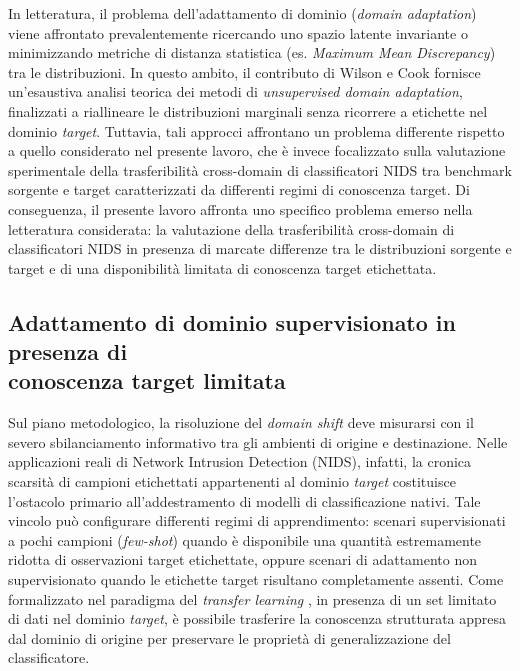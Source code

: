 In letteratura, il problema dell'adattamento di dominio (\textit{domain adaptation}) viene affrontato prevalentemente ricercando uno spazio latente invariante o minimizzando metriche di distanza statistica (es. \textit{Maximum Mean Discrepancy}) tra le distribuzioni. 
In questo ambito, il contributo di Wilson e Cook \cite{wilson2020} fornisce un'esaustiva analisi teorica dei metodi di \textit{unsupervised domain adaptation}, finalizzati a riallineare le distribuzioni marginali senza ricorrere a etichette nel dominio \textit{target}. 
Tuttavia, tali approcci affrontano un problema differente rispetto a quello considerato nel presente lavoro, che è invece focalizzato sulla valutazione sperimentale della trasferibilità cross-domain di classificatori NIDS tra benchmark sorgente e target caratterizzati da differenti regimi di conoscenza target.
Di conseguenza, il presente lavoro affronta uno specifico problema emerso nella letteratura considerata: la valutazione della trasferibilità cross-domain di classificatori NIDS in presenza di marcate differenze tra le distribuzioni sorgente e target e di una disponibilità limitata di conoscenza target etichettata.

\subsection[Adattamento di dominio supervisionato in presenza di conoscenza target limitata]{Adattamento di dominio supervisionato in presenza di\\conoscenza target limitata}
\label{subsec:supervised_da_nids}

Sul piano metodologico, la risoluzione del \textit{domain shift} deve misurarsi con il severo sbilanciamento informativo tra gli ambienti di origine e destinazione. 
Nelle applicazioni reali di Network Intrusion Detection (NIDS), infatti, la cronica scarsità di campioni etichettati appartenenti al dominio \textit{target} costituisce l'ostacolo primario all'addestramento di modelli di classificazione nativi. 
Tale vincolo può configurare differenti regimi di apprendimento: scenari supervisionati a pochi campioni (\textit{few-shot}) quando è disponibile una quantità estremamente ridotta di osservazioni target etichettate, oppure scenari di adattamento non supervisionato quando le etichette target risultano completamente assenti.
Come formalizzato nel paradigma del \textit{transfer learning} \cite{pan2010}, in presenza di un set limitato di dati nel dominio \textit{target}, è possibile trasferire la conoscenza strutturata appresa dal dominio di origine per preservare le proprietà di generalizzazione del classificatore.

